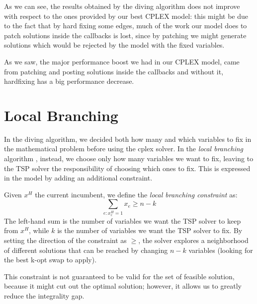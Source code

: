 As we can see, the results obtained by the diving algorithm does not improve with respect to the ones provided by our best CPLEX model: this might be due to the fact that by hard fixing some edges, much of the work our model does to patch solutions inside the callbacks is lost, since by patching we might generate solutions which would be rejected by the model with the fixed variables.

As we saw, the major performance boost we had in our CPLEX model, came from patching and posting solutions inside the callbacks and without it, hardfixing has a big performance decrease.

\section{Local Branching}

In the diving algorithm, we decided both how many and which variables to fix in the mathematical problem before using the cplex solver. In the \textit{local branching} algorithm \cite{Fischetti2003}, instead, we choose only how many variables we want to fix, leaving to the TSP solver the responsibility of choosing which ones to fix. This is expressed in the model by adding an additional constraint.

Given $x^H$ the current incumbent, we define the \textit{local branching constraint} as:
$$\sum_{e:x^H_e=1}x_e\geq n-k$$
The left-hand sum is the number of variables we want the TSP solver to keep from $x^H$, while $k$ is the number of variables we want the TSP solver to fix. By setting the direction of the constraint as $\geq$, the solver explores a neighborhood of different solutions that can be reached by changing $n-k$ variables (looking for the best k-opt swap to apply).

This constraint is not guaranteed to be valid for the set of feasible solution, because it might cut out the optimal solution; however, it allows us to greatly reduce the integrality gap.

\FloatBarrier
